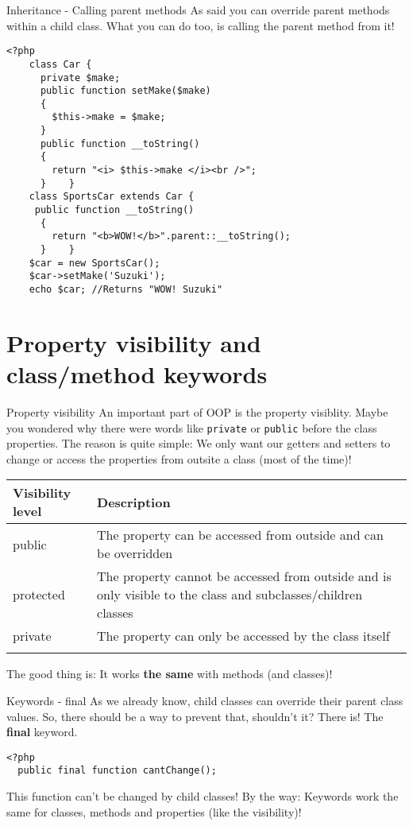 \begin{frame}[fragile]{Inheritance - Calling parent methods}
	As said you can override parent methods within a child class. What you can do too, is calling the parent method from it!
	\begin{lstlisting}
<?php
    class Car {
      private $make;
      public function setMake($make)
      {
        $this->make = $make;
      }
      public function __toString()
      {
        return "<i> $this->make </i><br />";
      }    }
    class SportsCar extends Car {
     public function __toString()
      {
        return "<b>WOW!</b>".parent::__toString();
      }    }
    $car = new SportsCar();
    $car->setMake('Suzuki');
  	echo $car; //Returns "WOW! Suzuki"
	\end{lstlisting}
\end{frame}

\section{Property visibility and class/method keywords}

\begin{frame}[fragile]{Property visibility}
	An important part of OOP is the property visiblity. Maybe you wondered why there were words like \texttt{private} or \texttt{public} before the class properties. \pause The reason is quite simple: We only want our getters and setters to change or access the properties from outsite a class (most of the time)!\pause
	\begin{center}
		\begin{tabular}{m{2.5cm} | m{5cm}}
			Visibility level & Description \\
			\hline \pause	
			public & The property can be accessed from outside and can be overridden 	\\
			\hline \pause	
			protected & The property cannot be accessed from outside and is only visible to the class and subclasses/children classes
			\\
			\hline \pause	
			private & The property can only be accessed by the class itself
			\\
			\hline \pause	
		\end{tabular}
	\end{center}
	The good thing is: It works \textbf{the same} with methods (and classes)!\pause
\end{frame}

\begin{frame}[fragile]{Keywords - final}
	As we already know, child classes can override their parent class values. So, there should be a way to prevent that, shouldn't it? \pause
	There is! The \textbf{final} keyword.
	\begin{lstlisting}
<?php
  public final function cantChange();
    \end{lstlisting}
    \pause
    This function can't be changed by child classes!
    By the way: Keywords work the same for classes, methods and properties (like the visibility)!
\end{frame}

